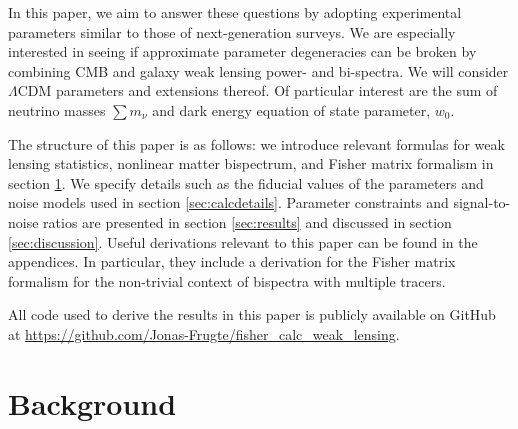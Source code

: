 \documentclass[11pt]{article} %
\begin{document}
In this paper, we aim to answer these questions by adopting experimental parameters similar to those of next-generation surveys. We are especially interested in seeing if approximate parameter degeneracies can be broken by combining CMB and galaxy weak lensing power- and bi-spectra. 
We will consider $\Lambda$CDM parameters and extensions thereof. Of particular interest are the sum of neutrino masses $\sum m_\nu$ and dark energy equation of state parameter, $w_0$. 

 

The structure of this paper is as follows: we introduce relevant formulas for weak lensing statistics, nonlinear matter bispectrum, and Fisher matrix formalism in section \ref{sec:theory}. We specify details such as the fiducial values of the parameters and noise models used in section \ref{sec:calcdetails}. Parameter constraints and signal-to-noise ratios are presented in section \ref{sec:results} and discussed in section \ref{sec:discussion}. Useful derivations relevant to this paper can be found in the appendices. In particular, they include a derivation for the Fisher matrix formalism for the non-trivial context of bispectra with multiple tracers.

All code used to derive the results in this paper is publicly available on GitHub at \url{https://github.com/Jonas-Frugte/fisher_calc_weak_lensing}.



%     

\section{Background}
\label{sec:theory}
\end{document}
